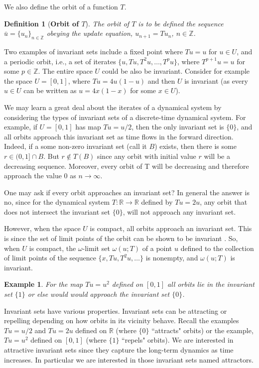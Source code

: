 \documentclass[a4paper,12pt,twoside]{report}
\newtheorem{Definition}{Definition}[]
\newtheorem{Example}{Example}[]
\begin{document}
We also define the orbit of a function $T$.
\begin{Definition}
  [\bf Orbit of $T$]\label{Dfn_Orbit}\rm
  The orbit of $T$ is to be defined the sequence $\bar{u} = \{u_n\}_{n\in \mathbb{Z}}$ obeying the update equation, $u_{n+1}=Tu_n$, $n \in \mathbb{Z}$. 
\end{Definition}

Two examples of invariant sets include a fixed point where $Tu=u$ for  $u\in U$, and a periodic orbit, i.e., a set of iterates $\{u,Tu, T^2u,\ldots,T^pu\}$, where $T^{p+1}u=u$ for some $p\in\mathbb{Z}$.  The entire space $U$ could be also be invariant.
Consider for example the space $U=[0,1]$, where $Tu=4u(1-u)$ and then $U$ is invariant (as every $u\in{U}$ can be written as $u = 4x(1-x)$ for some $x\in{U}$).

We may learn a great deal about the iterates of a dynamical system by considering the types of invariant sets of a discrete-time dynamical system.  For example, if $U=[0,1]$ has map $Tu= u/2$, then the only invariant set is $\{0\}$, and all orbits approach this invariant set as time flows in the forward direction. 
Indeed, if a some non-zero invariant set (call it $B$) exists, then there is  some $r\in(0,1]\cap{B}$. But $r\notin{T(B)}$ since any orbit with initial value $r$ will be a decreasing sequence. Moreover, every orbit of T will be decreasing and therefore approach the value $0$ as $n\rightarrow\infty$.

One may ask if every orbit approaches an invariant set? In general the answer is no, since for the dynamical system $T: \mathbb{R} \to \mathbb{R}$ defined by $Tu=2u$, any orbit that does not intersect the invariant set $\{0\}$, will not approach any invariant set. 

However,  when the space $U$ is compact, all orbits approach an invariant set. This is since the set of limit points of the orbit can be shown to be invariant \cite{de2013elements}. So, when $U$ is compact,  the $\omega$-limit set $\omega(u;T)$ of a point $u$ defined to the collection of limit points of the sequence $\{x,Tu,T^2u,\ldots\}$ is nonempty, and $\omega(u;T)$ is invariant. 

\begin{Example}
  For the map $Tu=u^2$ defined on $[0,1]$ all orbits lie in the invariant set $\{1\}$ or else would would approach the invariant set $\{0\}$. 
\end{Example}


Invariant sets have various properties. Invariant sets can be attracting or repelling depending on how orbits in its vicinity behave. 
Recall the examples $Tu =u/2$ and $Tu=2u$ defined on $\mathbb{R}$ (where $\{0\}$ ``attracts" orbits) or the example, $Tu=u^2$ defined on $[0,1]$ (where $\{1\}$ ``repels" orbits). We are interested in attractive invariant sets since they capture the long-term dynamics as time increases. 
In particular we are interested in those invariant sets named attractors.
\end{document}
